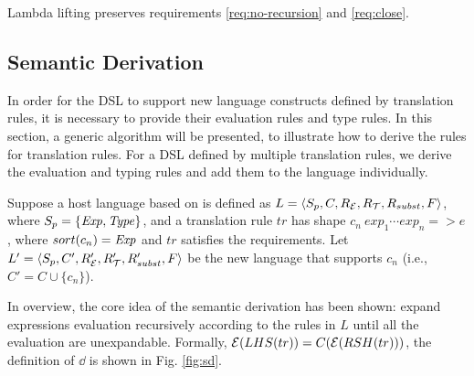
\begin{lemma}
  Lambda lifting preserves requirements \ref{req:no-recursion} and \ref{req:close}.
\end{lemma}

\subsection{Semantic Derivation}

In order for the DSL to support new language constructs defined by translation rules, 
 it is necessary to provide their evaluation rules and type rules.
In this section, a generic algorithm will be presented, 
 to illustrate how to derive the rules for translation rules.
For a DSL defined by multiple translation rules, 
 we derive the evaluation and typing rules and add them to the language individually.

Suppose a host language based on \STLC is defined as $L=\langle S_p, C, R_{\mathcal{E}}, R_{\mathcal{T}}, R_{subst}, F\rangle$,
where $S_p=\{\mathit{Exp},\mathit{Type}\}$,
and a translation rule $tr$ has shape $c_n~exp_1\cdots exp_n => e$,
where $sort(c_n)=\mathit{Exp}$ and $tr$ satisfies the requirements.
Let $L'=\langle S_p, C', R'_{\mathcal{E}}, R'_{\mathcal{T}}, R'_{subst}, F\rangle$ be the new language that supports $c_n$ (i.e., $C'=C \cup \{c_n\}$).

In overview, the core idea of the semantic derivation has been shown: 
 expand expressions evaluation recursively according to the rules in $L$ 
 until all the evaluation are unexpandable.
Formally, $\mathcal{E}(LHS(tr))=C(\mathcal{E}(RSH(tr)))$, the definition of $\dd$ is shown in Fig. \ref{fig:sd}.

